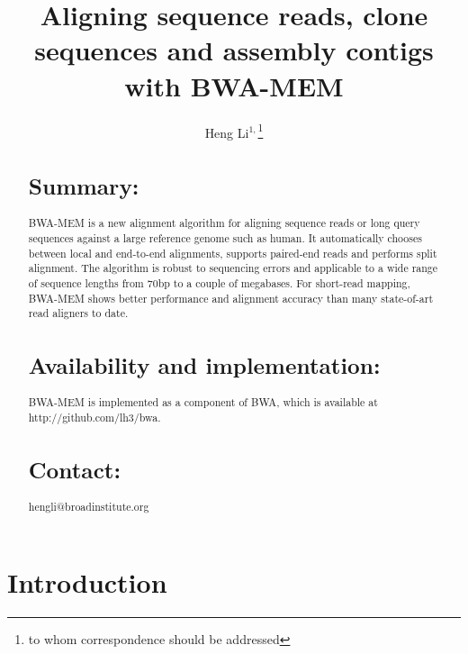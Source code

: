 \documentclass{bioinfo}
\begin{document}

\title{Aligning sequence reads, clone sequences and assembly contigs with BWA-MEM}

\author[Li]{Heng Li$^{1,}$\footnote{to whom correspondence should be addressed}}

\address{$^1$Broad Institute, 7 Cambridge Center, Cambridge, MA 02142, USA}

\maketitle

\begin{abstract}
\section{Summary:} BWA-MEM is a new alignment algorithm for aligning sequence
reads or long query sequences against a large reference genome such as human.
It automatically chooses between local and end-to-end alignments, supports
paired-end reads and performs split alignment. The algorithm is robust to
sequencing errors and applicable to a wide range of sequence lengths from 70bp
to a couple of megabases. For short-read mapping, BWA-MEM shows better
performance and alignment accuracy than many state-of-art read aligners to
date.

\section{Availability and implementation:} BWA-MEM is implemented as a
component of BWA, which is available at http://github.com/lh3/bwa.

\section{Contact:} hengli@broadinstitute.org
\end{abstract}

\section{Introduction}
\end{document}
